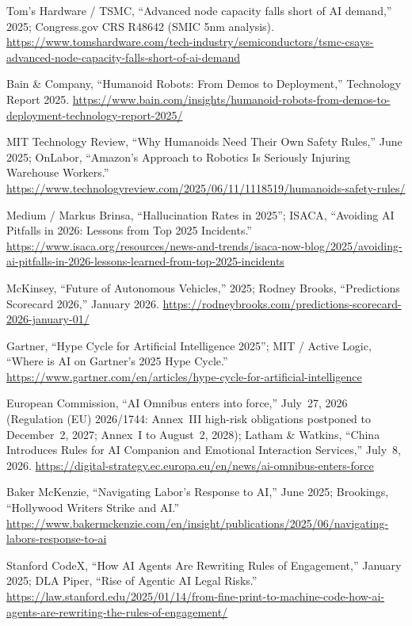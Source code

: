 \documentclass[11pt,a4paper]{article}
\begin{document}
\noindent [50] Tom's Hardware / TSMC, ``Advanced node capacity falls short of AI demand,'' 2025; Congress.gov CRS R48642 (SMIC 5nm analysis). \url{https://www.tomshardware.com/tech-industry/semiconductors/tsmc-csays-advanced-node-capacity-falls-short-of-ai-demand}

\noindent [51] Bain \& Company, ``Humanoid Robots: From Demos to Deployment,'' Technology Report 2025. \url{https://www.bain.com/insights/humanoid-robots-from-demos-to-deployment-technology-report-2025/}

\noindent [52] MIT Technology Review, ``Why Humanoids Need Their Own Safety Rules,'' June 2025; OnLabor, ``Amazon's Approach to Robotics Is Seriously Injuring Warehouse Workers.'' \url{https://www.technologyreview.com/2025/06/11/1118519/humanoids-safety-rules/}

\noindent [53] Medium / Markus Brinsa, ``Hallucination Rates in 2025''; ISACA, ``Avoiding AI Pitfalls in 2026: Lessons from Top 2025 Incidents.'' \url{https://www.isaca.org/resources/news-and-trends/isaca-now-blog/2025/avoiding-ai-pitfalls-in-2026-lessons-learned-from-top-2025-incidents}

\noindent [54] McKinsey, ``Future of Autonomous Vehicles,'' 2025; Rodney Brooks, ``Predictions Scorecard 2026,'' January 2026. \url{https://rodneybrooks.com/predictions-scorecard-2026-january-01/}

\noindent [55] Gartner, ``Hype Cycle for Artificial Intelligence 2025''; MIT / Active Logic, ``Where is AI on Gartner's 2025 Hype Cycle.'' \url{https://www.gartner.com/en/articles/hype-cycle-for-artificial-intelligence}

\noindent [56] European Commission, ``AI Omnibus enters into force,'' July~27, 2026 (Regulation (EU) 2026/1744: Annex~III high-risk obligations postponed to December~2, 2027; Annex~I to August~2, 2028); Latham \& Watkins, ``China Introduces Rules for AI Companion and Emotional Interaction Services,'' July~8, 2026. \url{https://digital-strategy.ec.europa.eu/en/news/ai-omnibus-enters-force}

\noindent [57] Baker McKenzie, ``Navigating Labor's Response to AI,'' June 2025; Brookings, ``Hollywood Writers Strike and AI.'' \url{https://www.bakermckenzie.com/en/insight/publications/2025/06/navigating-labors-response-to-ai}

\noindent [58] Stanford CodeX, ``How AI Agents Are Rewriting Rules of Engagement,'' January 2025; DLA Piper, ``Rise of Agentic AI Legal Risks.'' \url{https://law.stanford.edu/2025/01/14/from-fine-print-to-machine-code-how-ai-agents-are-rewriting-the-rules-of-engagement/}
\end{document}
